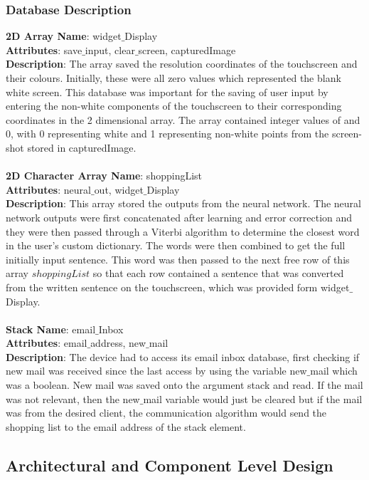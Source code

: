 \subsubsection{Database Description}
\textbf{2D Array Name}: widget$\_$Display\\
\textbf{Attributes}: save$\_$input, clear$\_$screen, capturedImage\\
\textbf{Description}: The array saved the resolution coordinates of the touchscreen and their colours. Initially, these were all zero values which represented the blank white screen. This database was important for the saving of user input by entering the non-white components of the touchscreen to their corresponding coordinates in the 2 dimensional array. The array contained integer values of  and 0, with 0 representing white and 1 representing non-white points from the screen-shot stored in capturedImage. \\\\
\textbf{2D Character Array Name}: shoppingList\\
\textbf{Attributes}: neural$\_$out, widget$\_$Display\\
\textbf{Description}: This array stored the outputs from the neural network. The neural network outputs were first concatenated after learning and error correction and they were then passed through a Viterbi algorithm to determine the closest word in the user's custom dictionary. The words were then combined to get the full initially input sentence. This word was then passed to the next free row of this array $shoppingList$ so that each row contained a sentence that was converted from the written sentence on the touchscreen, which was provided form widget$\_$Display.  \\\\
\textbf{Stack Name}: email$\_$Inbox\\
\textbf{Attributes}: email$\_$address, new$\_$mail\\
\textbf{Description}: The device had to access its email inbox database, first checking if new mail was received since the last access by using  the variable new$\_$mail which was a boolean. New mail was saved onto the argument stack and read. If the mail was not relevant, then the new$\_$mail variable would just be cleared but if the mail was from the desired client, the communication algorithm would send the shopping list to the email address of the stack element. 

\subsection{Architectural and Component Level Design}

